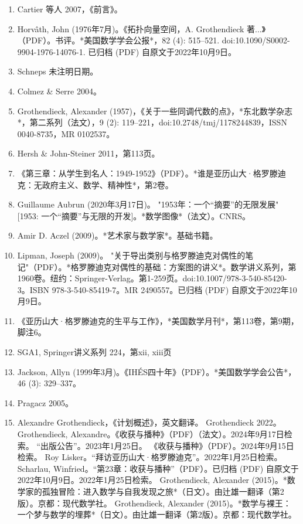 \begin{enumerate}
\item Cartier 等人 2007，《前言》。  
\item Horvâth, John (1976年7月)。《拓扑向量空间，A. Grothendieck 著...》（PDF）。书评。*美国数学学会公报*，82 (4): 515–521. doi:10.1090/S0002-9904-1976-14076-1. 已归档 (PDF) 自原文于2022年10月9日。  
\item Schneps 未注明日期。  
\item Colmez & Serre 2004。  
\item Grothendieck, Alexander (1957)，《关于一些同调代数的点》，*东北数学杂志*，第二系列（法文），9 (2): 119–221，doi:10.2748/tmj/1178244839，ISSN 0040-8735，MR 0102537。  
\item Hersh & John-Steiner 2011，第113页。  
\item 《第三章：从学生到名人：1949-1952》（PDF）。*谁是亚历山大·格罗滕迪克：无政府主义、数学、精神性*，第2卷。  
\item Guillaume Aubrun (2020年3月17日)。 "1953年：一个“摘要”的无限发展" [1953: 一个“摘要”与无限的开发]。*数学图像*（法文）。CNRS。  
\item Amir D. Aczel (2009)。*艺术家与数学家*。基础书籍。  
\item Lipman, Joseph (2009)。 "关于导出类别与格罗滕迪克对偶性的笔记"（PDF）。*格罗滕迪克对偶性的基础：方案图的讲义*。数学讲义系列，第1960卷。纽约：Springer-Verlag。第1-259页。doi:10.1007/978-3-540-85420-3。ISBN 978-3-540-85419-7。MR 2490557。已归档 (PDF) 自原文于2022年10月9日。  
\item 《亚历山大·格罗滕迪克的生平与工作》，*美国数学月刊*，第113卷，第9期，脚注6。
\item SGA1, Springer讲义系列 224，第xii, xiii页  
\item Jackson, Allyn (1999年3月)。《IHÉS四十年》（PDF）。*美国数学学会公告*，46 (3): 329–337。  
\item Pragacz 2005。  
\item Alexandre Grothendieck，《计划概述》，英文翻译。  
Grothendieck 2022。  
Grothendieck, Alexandre。《收获与播种》（PDF）（法文）。2024年9月17日检索。  
“出版公告”。2023年1月25日。  
《收获与播种》（PDF）。2024年9月15日检索。  
Roy Lisker。“拜访亚历山大·格罗滕迪克”。2022年1月25日检索。  
Scharlau, Winfried。“第23章：收获与播种”（PDF）。已归档 (PDF) 自原文于2022年10月9日。2022年1月25日检索。  
Grothendieck, Alexander (2015)。*数学家的孤独冒险：进入数学与自我发现之旅*（日文）。由辻雄一翻译（第2版）。京都：现代数学社。  
Grothendieck, Alexander (2015)。*数学与裸王：一个梦与数学的埋葬*（日文）。由辻雄一翻译（第2版）。京都：现代数学社。
\end{enumerate}